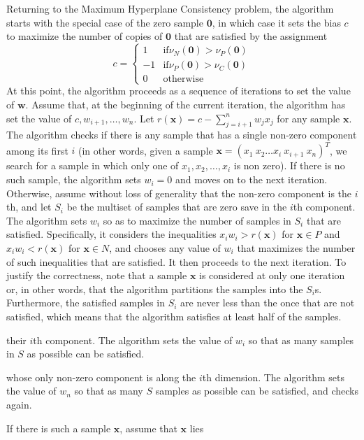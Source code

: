 \documentclass[11pt]{article}
\theoremstyle{definition}
\newcommand{\vect}[1]{\mathbf{#1}}
\begin{document}
Returning to the Maximum Hyperplane Consistency problem,  
the algorithm starts with the special case of the zero sample $\vect{0}$, in which 
case it sets the bias $c$ to maximize the number of copies of $\vect{0}$ that are satisfied by
the assignment 
$$c = \begin{cases} 
1 & \text{if} \nu_N(\vect{0}) > \nu_P(\vect{0})\\
-1 & \text{if} \nu_P(\vect{0}) > \nu_C(\vect{0})\\
0 & \text{otherwise}
\end{cases}$$
At this point, the algorithm proceeds as a sequence of iterations to set the value of $\vect{w}$.
Assume that, at the beginning of the current iteration,
the algorithm has set the value of $c, w_{i+1}, \dots, w_n$.
Let $r(\vect{x}) = c - \sum_{j = i + 1}^n w_j x_j$ for any sample $\vect{x}$.
The algorithm checks if there is any sample that has a single non-zero component among its first $i$
(in other words, given a sample $\vect{x} = (x_1 ~ x_2 \dots x_i ~ x_{i+1} ~ x_n)^T$,
we search for a sample in which only one of $x_1, x_2, \dots , x_i$ is non zero).
If there is no such sample, the algorithm sets $w_i = 0$ and moves on to the next iteration.
Otherwise, assume without loss of generality that the non-zero component is the $i$th,
and let $S_i$ be the multiset of samples that are zero save in the $i$th component. 
The algorithm sets $w_i$ so as to maximize the number of samples in $S_i$ that are satisfied. 
Specifically, it considers the inequalities 
$x_i w_i > r(\vect{x})$ for $\vect{x} \in P$ and 
$x_i w_i < r(\vect{x})$ for $\vect{x} \in N$, and
chooses any value of $w_i$ that maximizes the number of such inequalities that are satisfied. 
It then proceeds to the next iteration.
To justify the correctness, note that a sample $\vect{x}$ is considered at only one iteration or,
in other words, that the algorithm partitions the samples into the $S_i$s.
Furthermore, the satisfied samples in $S_i$ are never less than the once that are not satisfied,
which means that the algorithm satisfies at least half of the samples.

\iffalse
their $i$th component.
The algorithm sets the value of $w_i$ so that as many samples in $S$ as possible can be satisfied.


whose only non-zero component is along the $i$th dimension.
The algorithm sets the value of $w_n$ so that as many $S$ samples as possible can be satisfied,
and checks again.  

If there is such a sample $\vect{x}$, assume that $\vect{x}$ lies 
\end{document}
